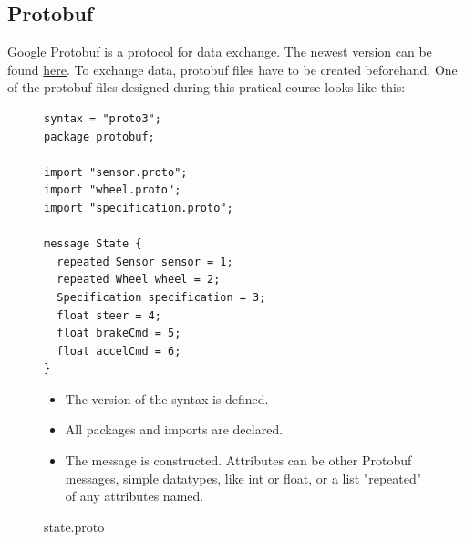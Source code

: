 \documentclass[paper=a4, fontsize=11pt]{scrreprt}
\begin{document}
  \subsection{Protobuf}
Google Protobuf is a protocol for data exchange.
The newest version can be found \href{https://github.com/google/protobuf}{here}.
To exchange data, protobuf files have to be created beforehand.
One of the protobuf files designed during this pratical course looks like this:
\begin{figure}[!h]
\begin{minipage}{0.5\textwidth}
\centering
  \begin{verbatim}
syntax = "proto3";
package protobuf;

import "sensor.proto";
import "wheel.proto";
import "specification.proto";

message State {
  repeated Sensor sensor = 1;
  repeated Wheel wheel = 2;
  Specification specification = 3;
  float steer = 4;
  float brakeCmd = 5;
  float accelCmd = 6;
}
  \end{verbatim}
\end{minipage}
  \begin{minipage}{0.5\textwidth}
    \begin{itemize}
\item The version of the syntax is defined.
\item All packages and imports are declared.
\item The message is constructed. Attributes can be other Protobuf messages, simple datatypes, like int or float, or a list "repeated" of any attributes named.
    \end{itemize}
  \end{minipage}
    \caption{state.proto}
  \end{figure}
\end{document}
